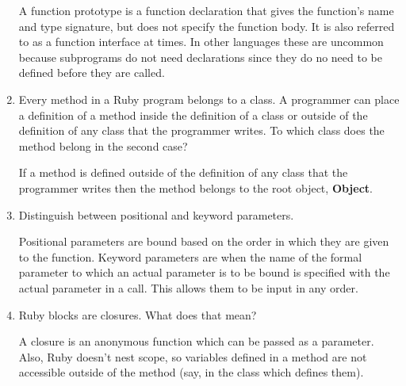 \begin{enumerate}
  \begin{answer}

    A function prototype is a function declaration that gives
    the function's name and type signature, but does not
    specify the function body. It is also referred to as a
    function interface at times. In other languages these are
    uncommon because subprograms do not need declarations since
    they do no need to be defined before they are called.

  \end{answer}

  \item Every method in a Ruby program belongs to a class.
    A programmer can place a definition of a method inside
    the definition of a class or outside of the definition
    of any class that the programmer writes. To which class
    does the method belong in the second case?

  \begin{answer}

    If a method is defined outside of the definition of any
    class that the programmer writes then the method belongs
    to the root object, \textbf{Object}.

  \end{answer}

  \item Distinguish between positional and keyword parameters.

  \begin{answer}

    Positional parameters are bound based on the order in which
    they are given to the function. Keyword parameters are when
    the name of the formal parameter to which an actual
    parameter is to be bound is specified with the actual
    parameter in a call. This allows them to be input in any
    order.

  \end{answer}

  \item Ruby blocks are closures. What does that mean?

  \begin{answer}

    A closure is an anonymous function which can be passed as
    a parameter. Also, Ruby doesn't nest scope, so variables
    defined in a method are not accessible outside of the
    method (say, in the class which defines them).

  \end{answer}


\end{enumerate}
